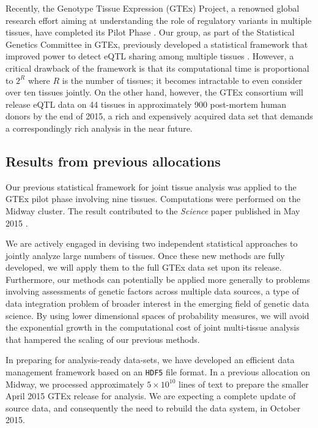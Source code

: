 \documentclass[10pt]{article}
\begin{document}
Recently, the Genotype Tissue Expression (GTEx) Project, a renowned
global research effort aiming at understanding the role of regulatory
variants in multiple tissues, have completed its Pilot Phase
\cite{ardlie.ea:genotype-tissue}.  Our group, as part of the
Statistical Genetics Committee in GTEx, previously developed a
statistical framework that improved power to detect eQTL sharing among
multiple tissues \cite{flutre.wen.ea:statistical}.  However, a
critical drawback of the framework is that its computational time is
proportional to $2^R$ where $R$ is the number of tissues; it becomes
intractable to even consider over ten tissues jointly. On the other
hand, however, the GTEx consortium will release eQTL data on 44
tissues in approximately 900 post-mortem human donors by the end of
2015, a rich and expensively acquired data set that demands a
correspondingly rich analysis in the near future.

\subsection*{Results from previous allocations}\label{gao-results-from-previous-allocations}

Our previous statistical framework for joint tissue analysis was
applied to the GTEx pilot phase involving nine tissues.  Computations
were performed on the Midway cluster.  The result contributed to the
\textit{Science} paper published in May 2015
\cite{ardlie.ea:genotype-tissue}.

We are actively engaged in devising two independent statistical
approaches to jointly analyze large numbers of tissues.  Once these
new methods are fully developed, we will apply them to the full GTEx
data set upon its release. Furthermore, our methods can potentially be
applied more generally to problems involving assessments of genetic
factors across multiple data sources, a type of data integration
problem of broader interest in the emerging field of genetic data
science. By using lower dimensional spaces of probability measures, we
will avoid the exponential growth in the computational cost of joint
multi-tissue analysis that hampered the scaling of our previous
methods.

In preparing for analysis-ready data-sets, we have developed an
efficient data management framework based on an \texttt{HDF5} file
format.  In a previous allocation on Midway, we processed
approximately $ 5 \times 10^{10} $ lines of text to prepare the
smaller April 2015 GTEx release for analysis. We are expecting a
complete update of source data, and consequently the need to rebuild
the data system, in October 2015.
\end{document}
